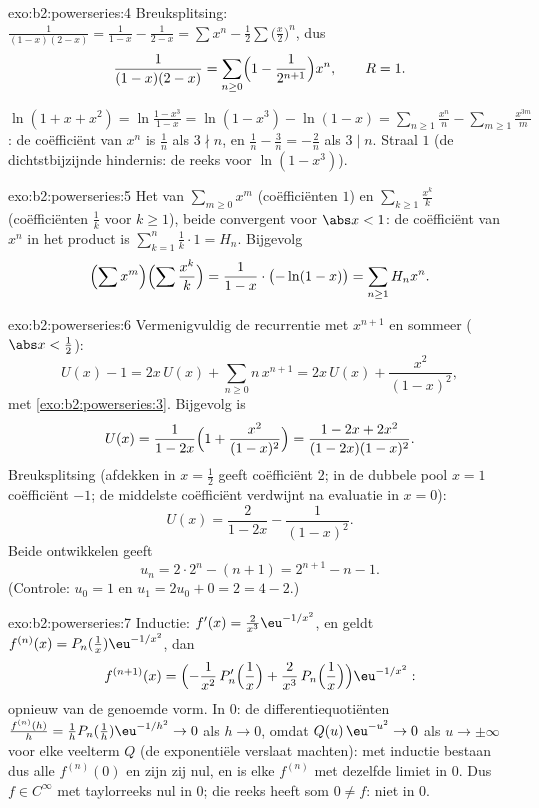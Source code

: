\begin{solution}{exo:b2:powerseries:4}
Breuksplitsing: $\frac{1}{(1-x)(2-x)} = \frac{1}{1-x} - \frac{1}{2
- x} = \sum x^n - \frac12\sum \bigl(\frac x2\bigr)^n$, dus
\[
\frac{1}{(1-x)(2-x)} = \sum_{n\geq0} \Bigl(1 -
\frac{1}{2^{n+1}}\Bigr)x^n,
\qquad R = 1 .
\]

$\ln(1 + x + x^2) = \ln\frac{1 - x^3}{1 - x} = \ln(1 - x^3) - \ln(1
- x) = \sum_{n\geq1}\frac{x^n}{n} -
\sum_{m\geq1}\frac{x^{3m}}{m}$: de coëfficiënt van $x^n$ is
$\frac1n$ als $3 \nmid n$, en $\frac1n - \frac{3}{n} = -\frac2n$
als $3 \mid n$. Straal $1$ (de dichtstbijzijnde hindernis: de reeks
voor $\ln(1-x^3)$).
\end{solution}

\begin{solution}{exo:b2:powerseries:5}
Het  van $\sum_{m \geq 0} x^m$ (coëfficiënten $1$) en
$\sum_{k\geq1} \frac{x^k}{k}$ (coëfficiënten $\frac1k$ voor $k \geq
1$), beide  convergent voor $\abs x < 1$: de coëfficiënt
van $x^n$ in het product is $\sum_{k=1}^{n} \frac1k \cdot 1 = H_n$.
Bijgevolg
\[
\Bigl(\sum x^m\Bigr)\Bigl(\sum \frac{x^k}{k}\Bigr)
= \frac{1}{1-x}\cdot\bigl(-\ln(1-x)\bigr)
= \sum_{n\geq1} H_n x^n .
\]
\end{solution}

\begin{solution}{exo:b2:powerseries:6}
Vermenigvuldig de recurrentie met $x^{n+1}$ en sommeer ($\abs x <
\frac12$):
\[
U(x) - 1 = 2x\,U(x) + \sum_{n\geq0} n\,x^{n+1}
= 2x\,U(x) + \frac{x^2}{(1-x)^2} ,
\]
met \cref{exo:b2:powerseries:3}. Bijgevolg is
\[
U(x) = \frac{1}{1 - 2x}\Bigl(1 + \frac{x^2}{(1-x)^2}\Bigr)
= \frac{1 - 2x + 2x^2}{(1-2x)(1-x)^2} .
\]
Breuksplitsing (afdekken in $x = \frac12$ geeft coëfficiënt $2$; in
de dubbele pool $x = 1$ coëfficiënt $-1$; de middelste coëfficiënt
verdwijnt na evaluatie in $x = 0$):
\[
U(x) = \frac{2}{1-2x} - \frac{1}{(1 - x)^2} .
\]
Beide ontwikkelen geeft
\[
u_n = 2\cdot 2^n - (n + 1) = 2^{n+1} - n - 1 .
\]
(Controle: $u_0 = 1$ en $u_1 = 2u_0 + 0 = 2 = 4 - 2$.)
\end{solution}

\begin{solution}{exo:b2:powerseries:7}
Inductie: $f'(x) = \frac{2}{x^3}\eu^{-1/x^2}$, en geldt
$f^{(n)}(x) = P_n(\tfrac1x)\eu^{-1/x^2}$, dan
\[
f^{(n+1)}(x) =
\Bigl(-\frac{1}{x^2}\,P_n'\Bigl(\frac1x\Bigr) +
\frac{2}{x^3}\,P_n\Bigl(\frac1x\Bigr)\Bigr)\eu^{-1/x^2} :
\]
opnieuw van de genoemde vorm. In $0$: de differentiequotiënten
$\frac{f^{(n)}(h)}{h} = \frac1h P_n(\frac1h)\eu^{-1/h^2} \to 0$ als
$h \to 0$, omdat $Q(u)\,\eu^{-u^2} \to 0$ als $u \to \pm\infty$
voor elke veelterm $Q$ (de exponentiële verslaat machten): met
inductie bestaan dus alle $f^{(n)}(0)$ en zijn zij nul, en is elke
$f^{(n)}$ met dezelfde limiet  in $0$. Dus $f \in C^\infty$
met taylorreeks nul in $0$; die reeks heeft som $0 \neq f$: niet
 in $0$.
\end{solution}

